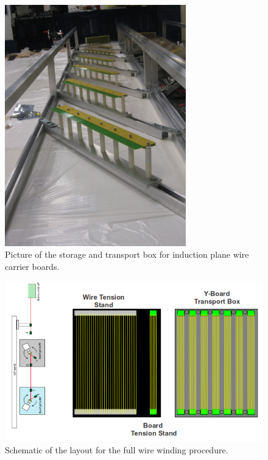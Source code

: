\begin{figure}[htb]
\centering
\includegraphics[angle =0,width=0.7\textwidth]{figures/wire-storagebox.jpg}
\caption{Picture of the storage and transport box for induction plane wire carrier boards.}
\label{boxes}
\end{figure}

\begin{figure}[htb]
\centering
\includegraphics[angle =0,width=\textwidth]{figures/wirewinding-layout.png}
\caption{Schematic of the layout for the full wire winding procedure.}
\label{lab_setup}
\end{figure}

